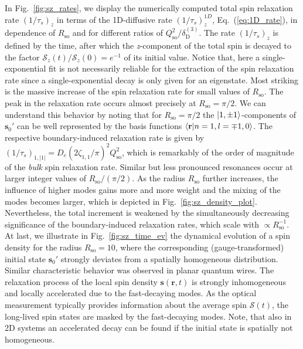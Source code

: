 \documentclass[superscriptaddress,noshowpacs,noshowkeys, twocolumn, floatfix,aps, prb,reprint]{revtex4-1}
\begin{document}
In Fig.~\ref{fig:sz_rates}, we display the numerically computed total spin relaxation rate $(1/\tau_s)_z$ in terms of the 1D-diffusive rate $(1/\tau_s)^{1D}_z$, Eq.~(\ref{eq:1D_rate}), in dependence of $R_\text{so}$ and for different ratios of $Q_\text{so}^2/\delta_\text{D}^{(3)}$.
The rate $(1/\tau_s)_z$ is defined by the time, after which the \textit{z}-component of the total spin is decayed to the factor $\mathcal{S}_z(t)/\mathcal{S}_z(0)=e^{-1}$ of its initial value.
Notice that, here a single-exponential fit is not necessarily reliable for the extraction of the spin relaxation rate since a single-exponential decay is only given for an eigenstate.
Most striking is the massive increase of the spin relaxation rate for small values of $R_\text{so}$.
The peak in the relaxation rate occurs almost precisely at $R_\text{so}=\pi/2$.
We can understand this behavior by noting that for $R_\text{so}=\pi/2$ the $\ket{1,\pm 1}$-components of $\mathbf{s}_0'$  can be well represented by the basis functions $\braket{\mathbf{r}|n=1,l=\mp 1,0}$.
The respective boundary-induced relaxation rate is given by $(1/\tau_s)_{1,\vert 1\vert}=D_e(2 \zeta_{1,1}/  \pi)^2 Q_\text{so}^2$, which is remarkably of the order of magnitude of the \textit{bulk} spin relaxation rate.
Similar but less pronounced resonances occur at larger integer values of $R_\text{so}/ (\pi/2)$.
As  the radius $R_\text{so}$ further increases, the influence of higher modes gains more and more weight and the mixing of the modes becomes larger, which is depicted in Fig.~\ref{fig:sz_density_plot}.
Nevertheless, the total increment is weakened by the simultaneously decreasing significance of the boundary-induced relaxation rates, which scale with $\propto R_\text{so}^{-1}$.
At last, we illustrate in Fig.~\ref{fig:sz_time_ev} the dynamical evolution of a spin density for the radius $R_\text{so}=10$, where the corresponding (gauge-transformed) initial state $\mathbf{s}_0'$ strongly deviates from a spatially homogeneous distribution.
Similar characteristic behavior was observed in planar quantum wires.\cite{Schwab2006}
The relaxation process of the local spin density $\mathbf{s}(\mathbf{r},t)$ is strongly inhomogeneous and locally  accelerated due to the fast-decaying modes.
As the optical measurement typically provides information about the average spin $\boldsymbol{\mathcal{S}}(t)$, the long-lived spin states are masked by the fast-decaying modes.
Note, that also in 2D systems an accelerated decay can be found if the initial state is spatially not homogeneous.\cite{Froltsov2001}
\end{document}
